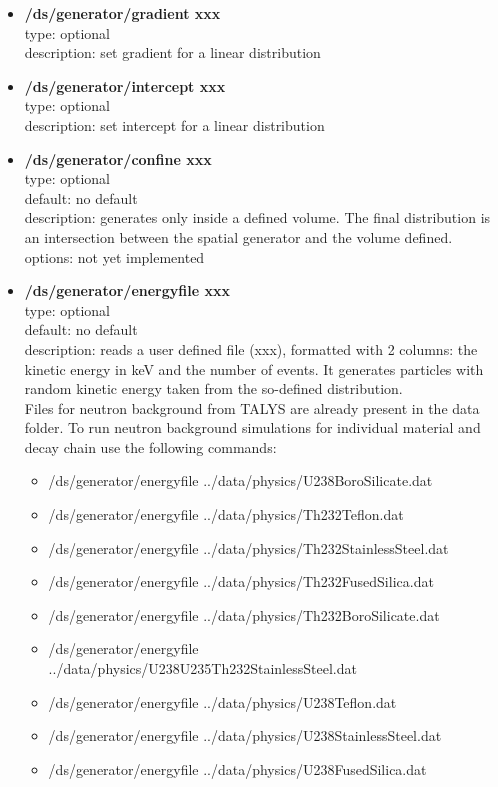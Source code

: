 \documentclass[twocolumn, 10pt]{article}
\begin{document}
\begin{itemize}
\item \textbf{/ds/generator/gradient xxx}\\
type: optional \\
description: set gradient for a linear distribution\\
  
\item \textbf{/ds/generator/intercept xxx}\\
type: optional \\
description: set intercept for a linear distribution\\


\item \textbf{/ds/generator/confine xxx}\\
type: optional \\
default: no default\\
description: generates only inside a defined volume. The final distribution is an intersection between the spatial
generator and the volume defined.\\
options: not yet implemented\\

\item \textbf{/ds/generator/energyfile xxx}\\
type: optional \\
default: no default\\
description: reads a user defined file (xxx), formatted with 2 columns: 
the kinetic energy in keV and the number of events. 
It generates particles with random kinetic energy taken from the so-defined distribution.\\

Files for neutron background from TALYS are already present in the data folder. To run neutron background simulations for individual material  and decay chain use the following commands:
\begin{itemize}
\item /ds/generator/energyfile  ../data/physics/U238BoroSilicate.dat
\item /ds/generator/energyfile  ../data/physics/Th232Teflon.dat
\item /ds/generator/energyfile  ../data/physics/Th232StainlessSteel.dat
\item /ds/generator/energyfile  ../data/physics/Th232FusedSilica.dat
\item /ds/generator/energyfile  ../data/physics/Th232BoroSilicate.dat
\item /ds/generator/energyfile  ../data/physics/U238U235Th232StainlessSteel.dat
\item /ds/generator/energyfile  ../data/physics/U238Teflon.dat
\item /ds/generator/energyfile  ../data/physics/U238StainlessSteel.dat
\item /ds/generator/energyfile  ../data/physics/U238FusedSilica.dat
\end{itemize}




\end{itemize}
\end{document}
